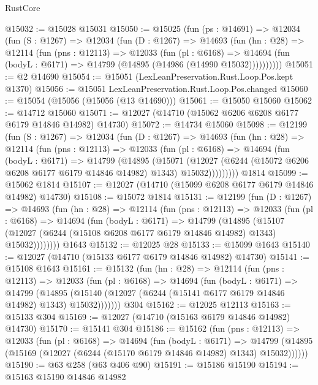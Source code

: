 \begin{lexlean}{RustCore}
\begin{coremodule}
@15032 := @15028 @15031
@15050 := @15025
    (fun (ps : @14691) =>
    @12034
      (fun (S : @1267) =>
      @12034
        (fun (D : @1267) =>
        @14693
          (fun (hn : @28) =>
          @12114
            (fun (pns : @12113) =>
            @12033
              (fun (pl : @6168) =>
              @14694 (fun (bodyL : @6171) => @14799 (@14895 (@14986 (@14990 @15032))))))))))
@15051 := @2 @14690
@15054 := @15051 (LexLeanPreservation.Rust.Loop.Pos.kept @1370)
@15056 := @15051 LexLeanPreservation.Rust.Loop.Pos.changed
@15060 := @15054 (@15056 (@15056 (@13 @14690)))
@15061 := @15050 @15060
@15062 := @14712 @15060
@15071 := @12027 (@14710 (@15062 @6206 @6208 @6177 @6179 @14846 @14982) @14730)
@15072 := @14734 @15060
@15098 := @12199
    (fun (S : @1267) =>
    @12034
      (fun (D : @1267) =>
      @14693
        (fun (hn : @28) =>
        @12114
          (fun (pns : @12113) =>
          @12033
            (fun (pl : @6168) =>
            @14694
              (fun (bodyL : @6171) =>
              @14799
                (@14895
                  (@15071
                    (@12027
                      (@6244 (@15072 @6206 @6208 @6177 @6179 @14846 @14982) @1343)
                      @15032)))))))))
    @1814
@15099 := @15062 @1814
@15107 := @12027 (@14710 (@15099 @6208 @6177 @6179 @14846 @14982) @14730)
@15108 := @15072 @1814
@15131 := @12199
    (fun (D : @1267) =>
    @14693
      (fun (hn : @28) =>
      @12114
        (fun (pns : @12113) =>
        @12033
          (fun (pl : @6168) =>
          @14694
            (fun (bodyL : @6171) =>
            @14799
              (@14895
                (@15107
                  (@12027 (@6244 (@15108 @6208 @6177 @6179 @14846 @14982) @1343) @15032))))))))
    @1643
@15132 := @12025 @28
@15133 := @15099 @1643
@15140 := @12027 (@14710 (@15133 @6177 @6179 @14846 @14982) @14730)
@15141 := @15108 @1643
@15161 := @15132
    (fun (hn : @28) =>
    @12114
      (fun (pns : @12113) =>
      @12033
        (fun (pl : @6168) =>
        @14694
          (fun (bodyL : @6171) =>
          @14799
            (@14895 (@15140 (@12027 (@6244 (@15141 @6177 @6179 @14846 @14982) @1343) @15032)))))))
    @304
@15162 := @12025 @12113
@15163 := @15133 @304
@15169 := @12027 (@14710 (@15163 @6179 @14846 @14982) @14730)
@15170 := @15141 @304
@15186 := @15162
    (fun (pns : @12113) =>
    @12033
      (fun (pl : @6168) =>
      @14694
        (fun (bodyL : @6171) =>
        @14799 (@14895 (@15169 (@12027 (@6244 (@15170 @6179 @14846 @14982) @1343) @15032))))))
@15190 := @63 @258 (@63 @406 @90)
@15191 := @15186 @15190
@15194 := @15163 @15190 @14846 @14982

\end{coremodule}
\end{lexlean}
